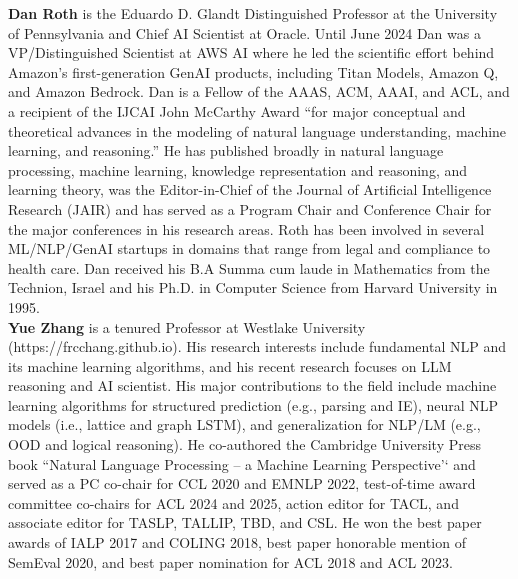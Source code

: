 \textbf{Dan Roth} is the Eduardo D. Glandt Distinguished Professor at the University of Pennsylvania and Chief AI Scientist at Oracle. Until June 2024 Dan was a VP/Distinguished Scientist at AWS AI where he led the scientific effort behind Amazon’s first-generation GenAI products, including Titan Models, Amazon Q, and Amazon Bedrock.  Dan is a Fellow of the AAAS, ACM, AAAI, and ACL, and a recipient of the IJCAI John McCarthy Award “for major conceptual and theoretical advances in the modeling of natural language understanding, machine learning, and reasoning.” He has published broadly in natural language processing, machine learning, knowledge representation and reasoning, and learning theory, was the Editor-in-Chief of the Journal of Artificial Intelligence Research (JAIR) and has served as a Program Chair and Conference Chair for the major conferences in his research areas. Roth has been involved in several ML/NLP/GenAI startups in domains that range from legal and compliance to health care. Dan received his B.A Summa cum laude in Mathematics from the Technion, Israel and his Ph.D. in Computer Science from Harvard University in 1995.\\

\textbf{Yue Zhang} is a tenured Professor at Westlake University (https://frcchang.github.io). His research interests include fundamental NLP and its machine learning algorithms, and his recent research focuses on LLM reasoning and AI scientist. His major contributions to the field include machine learning algorithms for structured prediction (e.g., parsing and IE), neural NLP models (i.e., lattice and graph LSTM), and generalization for NLP/LM (e.g., OOD and logical reasoning). He co-authored the Cambridge University Press book ``Natural Language Processing -- a Machine Learning Perspective'‘ and served as a PC co-chair for CCL 2020 and EMNLP 2022, test-of-time award committee co-chairs for ACL 2024 and 2025, action editor for TACL, and associate editor for TASLP, TALLIP, TBD, and CSL. He won the best paper awards of IALP 2017 and COLING 2018, best paper honorable mention of SemEval 2020, and best paper nomination for ACL 2018 and ACL 2023.\\

